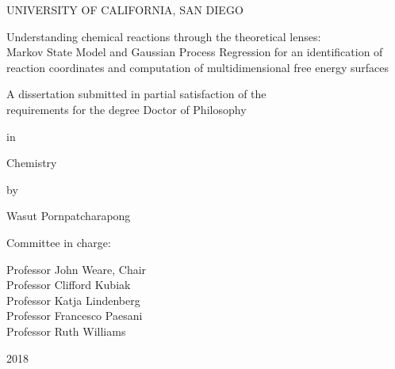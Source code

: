 \begin{titlepage}\begin{center}
    UNIVERSITY OF CALIFORNIA, SAN DIEGO

    \vspace{1.3cm}

    {Understanding chemical reactions through the theoretical lenses: \\
    Markov State Model and Gaussian Process Regression for an identification of \\
    reaction coordinates and computation of multidimensional free energy surfaces}

    \vspace{1.3cm}

    {A dissertation submitted in partial satisfaction of the \\
    requirements for the degree Doctor of Philosophy}

    \vspace{1.3cm}

    in

    \vspace{0.7cm}

    Chemistry

    \vspace{1.3cm}

    by

    \vspace{0.7cm}

    Wasut Pornpatcharapong
\end{center}

\vspace{1.3cm}

\noindent Committee in charge:

\noindent\hspace{0.5in} Professor John Weare, Chair \\
\noindent\hspace*{0.5in} Professor Clifford Kubiak \\
\noindent\hspace*{0.5in} Professor Katja Lindenberg \\
\noindent\hspace*{0.5in} Professor Francesco Paesani \\
\noindent\hspace*{0.5in} Professor Ruth Williams

\vspace{0.7cm}

\begin{center}
    2018
\end{center}\end{titlepage}
